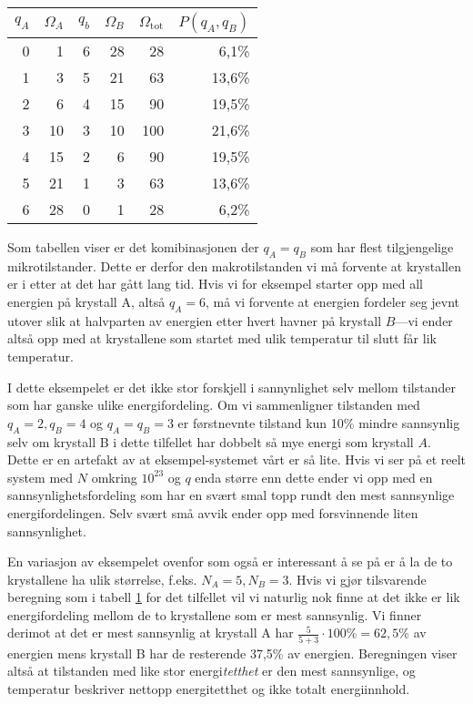 \begin{table}[htp]
\begin{center}
\begin{tabular}{rr|rr|r|r}
$q_A$ & $\Omega_A$ & $q_b$ & $\Omega_B$ & $\Omega_\text{tot}$ & $P(q_A,q_B)$ \\ 
\hline
0 & 1 & 6 & 28 & 28 & 6,1\% \\
1 & 3 & 5 & 21 & 63 & 13,6\% \\
2 & 6 & 4 & 15 & 90 & 19,5\%\\
3 & 10 & 3 & 10 & 100 & 21,6\% \\
4 & 15 & 2 & 6 & 90 & 19,5\% \\
5 & 21 & 1 & 3 & 63 & 13,6\% \\
6 & 28 & 0 & 1 & 28 & 6,2\% \\
\end{tabular}
\end{center}
\caption{}
\label{tab:t2:multipl2}
\end{table}

Som tabellen viser er det komibinasjonen der $q_A = q_B$ som har flest tilgjengelige mikrotilstander. Dette er derfor den makrotilstanden vi må forvente at krystallen er i etter at det har gått lang tid. Hvis vi for eksempel starter opp med all energien på krystall A, altså $q_A = 6$, må vi forvente at energien fordeler seg jevnt utover slik at halvparten av energien etter hvert havner på krystall $B$---vi ender altså opp med at krystallene som startet med ulik temperatur til slutt får lik temperatur.

I dette eksempelet er det ikke stor forskjell i sannynlighet selv mellom tilstander som har ganske ulike energifordeling. Om vi sammenligner tilstanden med $q_A=2, q_B=4$ og $q_A = q_B = 3$ er førstnevnte tilstand kun 10\% mindre sannsynlig selv om krystall B i dette tilfellet har dobbelt så mye energi som krystall $A$. Dette er en artefakt av at eksempel-systemet vårt er så lite. Hvis vi ser på et reelt system med $N$ omkring $10^{23}$ og $q$ enda større enn dette ender vi opp med en sannsynlighetsfordeling som har en svært smal topp rundt den mest sannsynlige energifordelingen. Selv svært små avvik ender opp med forsvinnende liten sannsynlighet.

En variasjon av eksempelet ovenfor som også er interessant å se på er å la de to krystallene ha ulik størrelse, f.eks. $N_A = 5, N_B = 3$. Hvis vi gjør tilsvarende beregning som i tabell \ref{tab:t2:multipl2} for det tilfellet vil vi naturlig nok finne at det ikke er lik energifordeling mellom de to krystallene som er mest sannsynlig. Vi finner derimot at det er mest sannsynlig at krystall A har $\frac{5}{5+3}\cdot100\% = 62,5\%$ av energien mens krystall B har de resterende 37,5\% av energien. Beregningen viser altså at tilstanden med like stor energi\emph{tetthet} er den mest sannsynlige, og temperatur beskriver nettopp energitetthet og ikke totalt energiinnhold. 

